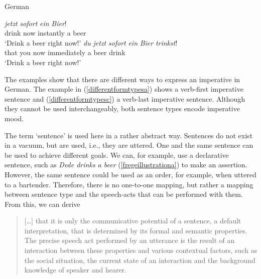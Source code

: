 \begin{exe}
\ex German \label{differntdorm}\begin{xlist} 
\ex {} {\textit{jetzt}} {\textit{sofort}} {\textit{ein}} {\textit{Bier}!}  \\
{drink} {now} {instantly} {a} {beer} \\
\trans `Drink a beer right now!' \label{differentformtypesa}
\ex {} {\textit{du}} {\textit{jetzt}} {\textit{sofort}} {\textit{ein}} {\textit{Bier}} {\textit{trinkst}!}\\
{that} {you} {now} {immediately} {a} {beer} {drink} \\
\trans `Drink a beer right now!' \label{differentformtypesc}
\end{xlist}
\end{exe} 

\noindent The examples show that there are different ways to express an imperative in German. The example in (\ref{differentformtypesa}) shows a verb-first imperative sentence and (\ref{differentformtypesc}) a verb-last imperative sentence. Although they cannot be used interchangeably, both sentence types encode imperative mood.

The term `sentence' is used here in a rather abstract way. Sentences do not exist in a vacuum, but are used, i.e., they are uttered. One and the same sentence can be used to achieve different goals. We can, for example, use a declarative sentence, such as \textit{Dede drinks a beer} (\ref{fregeillustrationa}) to make an assertion. However, the same sentence could be used as an order, for example, when uttered to a bartender. Therefore, there is no one-to-one mapping, but rather a mapping between sentence type and the speech-acts that can be performed with them. From this, we can derive 

\begin{quote}
$[$\dots $]$ that it is only the communicative potential of a sentence, a default interpretation, that is determined by its formal and semantic properties. The precise speech act performed by an utterance is the result of an interaction between these properties and various contextual factors, such as the social situation, the current state of an interaction and the background knowledge of speaker and hearer. \citep[277]{konig2007speech}
\end{quote} 


